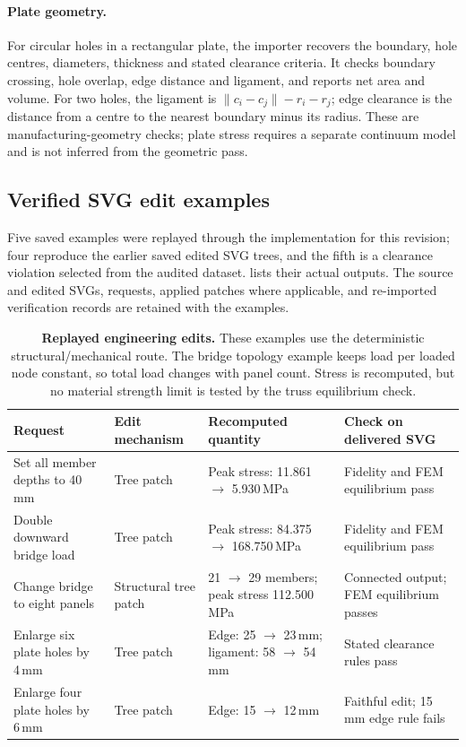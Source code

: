 \paragraph{Plate geometry.} For circular holes in a rectangular plate, the importer recovers the
boundary, hole centres, diameters, thickness and stated clearance criteria. It checks boundary
crossing, hole overlap, edge distance and ligament, and reports net area and volume. For two holes,
the ligament is $\|c_i-c_j\|-r_i-r_j$; edge clearance is the distance from a centre to the nearest
boundary minus its radius. These are manufacturing-geometry checks; plate stress requires a separate
continuum model and is not inferred from the geometric pass.

\subsection{Verified SVG edit examples}
Five saved examples were replayed through the implementation for this revision; four reproduce the
earlier saved edited SVG trees, and the fifth is a clearance violation selected from the audited dataset.
 lists their actual outputs. The source and edited SVGs, requests, applied patches
where applicable, and re-imported verification records are retained with the examples.

\begin{table}[t]
\centering\small
\setlength{\tabcolsep}{4pt}
\begin{tabular}{@{}p{3.5cm}p{2.8cm}p{5cm}p{4.2cm}@{}}
\toprule
Request & Edit mechanism & Recomputed quantity & Check on delivered SVG \\
\midrule
Set all member depths to 40\,mm & Tree patch & Peak stress: 11.861 $\to$ 5.930\,MPa & Fidelity and FEM equilibrium pass \\
Double downward bridge load & Tree patch & Peak stress: 84.375 $\to$ 168.750\,MPa & Fidelity and FEM equilibrium pass \\
Change bridge to eight panels & Structural tree patch & 21 $\to$ 29 members; peak stress 112.500\,MPa & Connected output; FEM equilibrium passes \\
Enlarge six plate holes by 4\,mm & Tree patch & Edge: 25 $\to$ 23\,mm; ligament: 58 $\to$ 54\,mm & Stated clearance rules pass \\
Enlarge four plate holes by 6\,mm & Tree patch & Edge: 15 $\to$ 12\,mm & Faithful edit; 15\,mm edge rule fails \\
\bottomrule
\end{tabular}
\caption{\textbf{Replayed engineering edits.} These examples use the deterministic structural/mechanical
route. The bridge topology example keeps load per loaded node constant, so total load changes with
panel count. Stress is recomputed, but no material strength limit is tested by the truss equilibrium check.}
\label{tab:worked-edits}
\end{table}

